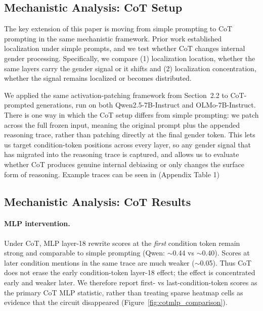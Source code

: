 \documentclass{article}
\begin{document}
\subsection{Mechanistic Analysis: CoT Setup}
The key extension of this paper is moving from simple prompting to CoT prompting in the same mechanistic framework. Prior work established localization under simple prompts, and we test whether CoT changes internal gender processing. Specifically, we compare (1) localization location, whether the same layers carry the gender signal or it shifts and (2) localization concentration, whether the signal remains localized or becomes distributed.

We applied the same activation-patching framework from Section~2.2 to CoT-prompted generations, run on both Qwen2.5-7B-Instruct and OLMo-7B-Instruct. There is one way in which the CoT setup differs from simple prompting: we patch across the full frozen input, meaning the original prompt plus the appended reasoning trace, rather than patching directly at the final gender token. This lets us target condition-token positions across every layer, so any gender signal that has migrated into the reasoning trace is captured, and allows us to evaluate whether CoT produces genuine internal debiasing or only changes the surface form of reasoning. Example traces can be seen in (Appendix Table 1)

\subsection{Mechanistic Analysis: CoT Results}
\paragraph{MLP intervention.} Under CoT, MLP layer-18 rewrite scores at the \emph{first} condition token remain strong and comparable to simple prompting (Qwen: $\sim$0.44 vs $\sim$0.40). Scores at later condition mentions in the same trace are much weaker ($\sim$0.05). Thus CoT does not erase the early condition-token layer-18 effect; the effect is concentrated early and weaker later. We therefore report first- vs last-condition-token scores as the primary CoT MLP statistic, rather than treating sparse heatmap cells as evidence that the circuit disappeared (Figure~\ref{fig:cotmlp_comparison}).


\end{document}
